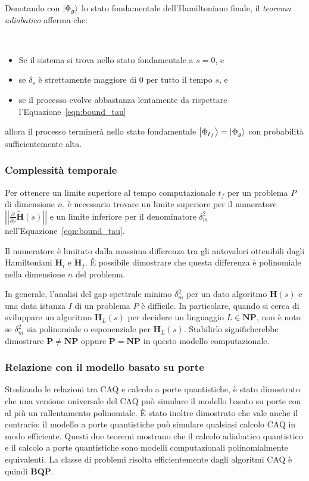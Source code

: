 Denotando con $\Ket{\Phi_g}$ lo stato fondamentale dell'Hamiltoniano finale, il \emph{teorema adiabatico} afferma che:
\begin{theorem}\ 
	\begin{itemize}
		\item Se il sistema si trova nello stato fondamentale a $s = 0$, e
		\item se $\delta_s$ è strettamente maggiore di $0$ per tutto il tempo $s$, e
		\item se il processo evolve abbastanza lentamente da rispettare l'Equazione~\ref{eqn:bound_tau}
	\end{itemize}
	allora il processo terminerà nello stato fondamentale $\Ket{\Phi_{t_f}} = \Ket{\Phi_g}$ con probabilità sufficientemente alta.
\end{theorem}

\subsubsection*{Complessità temporale}
Per ottenere un limite superiore al tempo computazionale $t_f$ per un problema $P$ di dimensione $n$, è necessario trovare un limite superiore per il numeratore $\left|\left|\frac{\partial}{\partial s} \tilde{\mathbf{H}}(s)\right|\right|$ e un limite inferiore per il denominatore $\delta_m^2$ nell'Equazione~\ref{eqn:bound_tau}.

Il numeratore è limitato dalla massima differenza tra gli autovalori ottenibili dagli Hamiltoniani $\mathbf{H}_i$ e $\mathbf{H}_f$. È possibile dimostrare che questa differenza è polinomiale nella dimensione $n$ del problema.

In generale, l'analisi del gap spettrale minimo $\delta_m^2$ per un dato algoritmo $\mathbf{H}(s)$ e una data istanza $I$ di un problema $P$ è difficile. In particolare, quando si cerca di sviluppare un algoritmo $\mathbf{H}_{L}(s)$ per decidere un linguaggio $L \in \textbf{NP}$, non è noto se $\delta_m^2$ sia polinomiale o esponenziale per $\mathbf{H}_{L}(s)$. Stabilirlo significherebbe dimostrare $\mathbf{P} \neq \textbf{NP}$ oppure $\mathbf{P} = \textbf{NP}$ in questo modello computazionale.
\newpage
\subsubsection*{Relazione con il modello basato su porte}
Studiando  le relazioni tra CAQ e calcolo a porte quantistiche, è stato dimostrato che una versione universale del CAQ può simulare il modello basato su porte con al più un rallentamento polinomiale. È stato inoltre dimostrato che vale anche il contrario: il modello a porte quantistiche può simulare qualsiasi calcolo CAQ in modo efficiente. Questi due teoremi mostrano che il calcolo adiabatico quantistico e il calcolo a porte quantistiche sono modelli computazionali polinomialmente equivalenti. La classe di problemi risolta efficientemente dagli algoritmi CAQ è quindi \textbf{BQP}.

